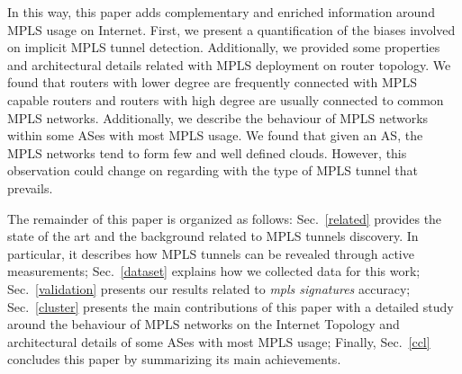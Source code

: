 In this way, this paper adds complementary and enriched information around MPLS
usage on Internet. First, we present a quantification of the biases involved on
implicit MPLS tunnel detection. Additionally, we provided some properties and
architectural details related with MPLS deployment on router topology. We found
that routers with lower degree are frequently connected with MPLS capable
routers and routers with high degree are usually connected to common MPLS
networks. Additionally, we describe the behaviour of MPLS networks within some
ASes with most MPLS usage. We found that given an AS, the MPLS networks tend to
form few and well defined clouds. However, this observation could change on
regarding with the type of MPLS tunnel that prevails.


The remainder of this paper is organized as follows: Sec.~\ref{related} provides
the state of the art and the background related to MPLS tunnels discovery. In
particular, it describes how MPLS tunnels can be revealed through active
measurements;  Sec.~\ref{dataset} explains how we collected data for this work;
Sec.~\ref{validation} presents our results related to \textit{mpls signatures}
accuracy; Sec.~\ref{cluster} presents the main contributions of this paper with
a detailed study around the behaviour of MPLS networks on the Internet Topology
and architectural details of some ASes with most MPLS usage; Finally,
Sec.~\ref{ccl} concludes this paper by summarizing its main achievements.

